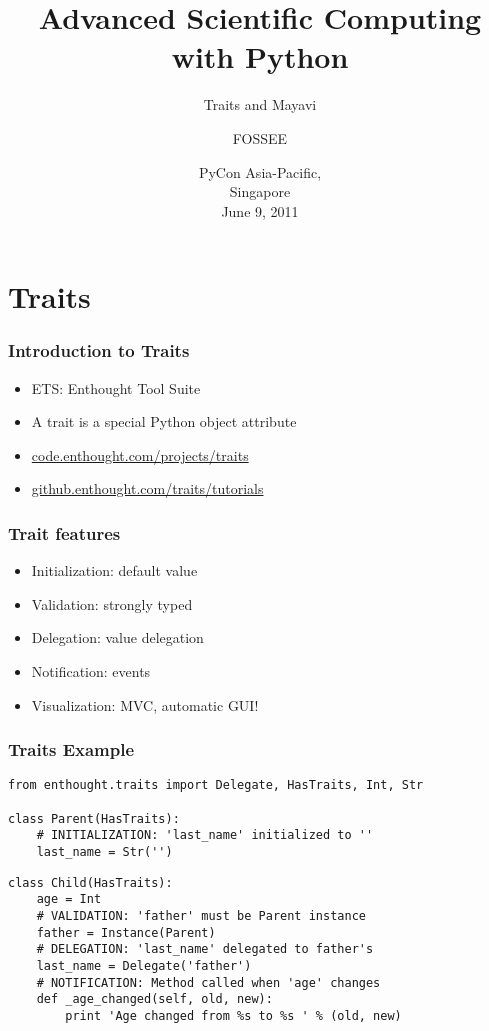\documentclass[14pt,compress]{beamer}
\title[Advanced Sci Comp.]{Advanced Scientific Computing with
Python}
\subtitle{Traits and Mayavi}
\author[FOSSEE] {FOSSEE}
\institute[IIT Bombay] {Department of Aerospace Engineering\\IIT Bombay}
\date[] {PyCon Asia-Pacific,\\
Singapore\\
June 9, 2011
}
\begin{document}
\begin{frame}
  \maketitle
\end{frame}

\section{Traits}

\begin{frame}
  \frametitle{Introduction to Traits}
  \begin{itemize}
    \item ETS: Enthought Tool Suite
    \item A \alert{trait} is a \alert{special} Python object attribute
        \vspace*{2em}

    \item \url{code.enthought.com/projects/traits}
    \item \url{github.enthought.com/traits/tutorials}

  \end{itemize}
\end{frame}

\begin{frame}
  \frametitle{Trait features}
  \begin{itemize}
    \item Initialization: default value
    \item Validation: strongly typed
    \item Delegation: value delegation
    \item Notification: events
    \item Visualization: MVC, automatic GUI!
  \end{itemize}
\end{frame}

\begin{frame}
  \frametitle{Traits Example}
\vspace*{-16pt}
\footnotesize
\begin{lstlisting}
from enthought.traits import Delegate, HasTraits, Int, Str

class Parent(HasTraits):
    # INITIALIZATION: 'last_name' initialized to ''
    last_name = Str('') 
\end{lstlisting}
\pause
\begin{lstlisting}
class Child(HasTraits):
    age = Int
    # VALIDATION: 'father' must be Parent instance
    father = Instance(Parent)
    # DELEGATION: 'last_name' delegated to father's 
    last_name = Delegate('father') 
    # NOTIFICATION: Method called when 'age' changes
    def _age_changed(self, old, new): 
        print 'Age changed from %s to %s ' % (old, new)
\end{lstlisting}
\end{frame}
\end{document}
